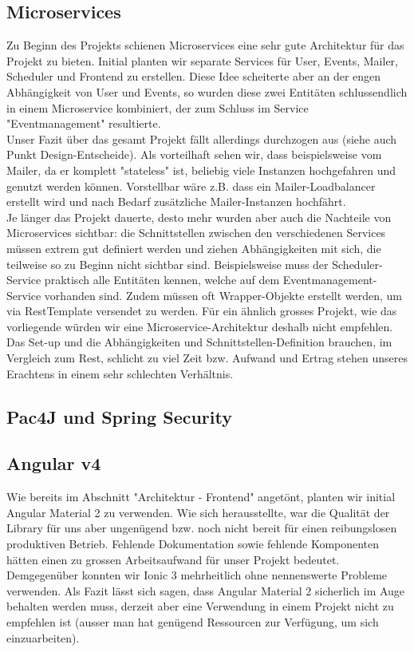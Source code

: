 \documentclass[11pt]{article} %
\begin{document}
\subsection{Microservices}
Zu Beginn des Projekts schienen Microservices eine sehr gute Architektur für das Projekt zu bieten. Initial planten wir separate Services für User, Events, Mailer, Scheduler und Frontend zu erstellen. Diese Idee scheiterte aber an der engen Abhängigkeit von User und Events, so wurden diese zwei Entitäten schlussendlich in einem Microservice kombiniert, der zum Schluss im Service "Eventmanagement" resultierte.
\\
Unser Fazit über das gesamt Projekt fällt allerdings durchzogen aus (siehe auch Punkt Design-Entscheide). Als vorteilhaft sehen wir, dass beispielsweise vom Mailer, da er komplett "stateless" ist, beliebig viele Instanzen hochgefahren und genutzt werden können. Vorstellbar wäre z.B. dass ein Mailer-Loadbalancer erstellt wird und nach Bedarf zusätzliche Mailer-Instanzen hochfährt.
\\
Je länger das Projekt dauerte, desto mehr wurden aber auch die Nachteile von Microservices sichtbar: die Schnittstellen zwischen den verschiedenen Services müssen extrem gut definiert werden und ziehen Abhängigkeiten mit sich, die teilweise so zu Beginn nicht sichtbar sind. Beispielsweise muss der Scheduler-Service praktisch alle Entitäten kennen, welche auf dem Eventmanagement-Service vorhanden sind. Zudem müssen oft Wrapper-Objekte erstellt werden, um via RestTemplate versendet zu werden. Für ein ähnlich grosses Projekt, wie das vorliegende würden wir eine Microservice-Architektur deshalb nicht empfehlen. Das Set-up und die Abhängigkeiten und Schnittstellen-Definition brauchen, im Vergleich zum Rest, schlicht zu viel Zeit bzw. Aufwand und Ertrag stehen unseres Erachtens in einem sehr schlechten Verhältnis.
\subsection{Pac4J und Spring Security}

\subsection{Angular v4}
Wie bereits im Abschnitt "Architektur - Frontend" angetönt, planten wir initial Angular Material 2 zu verwenden. Wie sich herausstellte, war die Qualität der Library für uns aber ungenügend bzw. noch nicht bereit für einen reibungslosen produktiven Betrieb. Fehlende Dokumentation sowie fehlende Komponenten hätten einen zu grossen Arbeitsaufwand für unser Projekt bedeutet. Demgegenüber konnten wir Ionic 3 mehrheitlich ohne nennenswerte Probleme verwenden. Als Fazit lässt sich sagen, dass Angular Material 2 sicherlich im Auge behalten werden muss, derzeit aber eine Verwendung in einem Projekt nicht zu empfehlen ist (ausser man hat genügend Ressourcen zur Verfügung, um sich einzuarbeiten).
\end{document}

